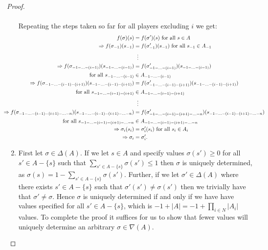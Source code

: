 \begin{proposition}
\begin{proof}
\begin{enumerate}
\begin{align*}
				\end{align*}
				Repeating the steps taken so far for all players excluding $i$ we get:
				\begin{align*}
					f(\sigma)(s) &= f(\sigma')(s) \text{ for all } s \in A\\
					\Rightarrow f(\sigma_{-1})(s_{-1}) &= f(\sigma'_{-1})(s_{-1}) \text{ for all } s_{-1} \in A_{-1} \\
					&\hspace{2mm} \vdots \\
					\Rightarrow f(\sigma_{-1-\ldots-(i-1)})(s_{-1-\ldots-(i-1)}) &= f(\sigma'_{-1-\ldots-(i-1)})(s_{-1-\ldots-(i-1)}) \\
					\text{ for all } s_{-1-\ldots-(i-1)} &\in A_{-1-\ldots-(i-1)} \\
					\Rightarrow f(\sigma_{-1-\ldots-(i-1)-(i+1)})(s_{-1-\ldots-(i-1)-(i+1)}) &= f(\sigma'_{-1-\ldots-(i-1)-(i+1)})(s_{-1-\ldots-(i-1)-(i+1)}) \\
					\text{ for all } s_{-1-\ldots-(i-1)-(i+1)} &\in A_{-1-\ldots-(i-1)-(i+1)} \\
					&\hspace{2mm} \vdots \\
					\hspace{-1cm}\Rightarrow f(\sigma_{-1-\ldots-(i-1)-(i+1)-\ldots-n})(s_{-1-\ldots-(i-1)-(i+1)-\ldots-n}) &= f(\sigma'_{-1-\ldots-(i-1)-(i+1)-\ldots-n})(s_{-1-\ldots-(i-1)-(i+1)-\ldots-n}) \\
					\text{ for all } s_{-1-\ldots-(i-1)-(i+1)-\ldots-n} &\in A_{-1-\ldots-(i-1)-(i+1)-\ldots-n} \\
					\Rightarrow \sigma_i(s_i) &= \sigma'_i(s_i) \text{ for all } s_i \in A_i \\
					\Rightarrow \sigma_i &= \sigma_i'.
				\end{align*}
				\item First let $\sigma \in \Delta(A)$. If we let $s \in A$ and specify values $\sigma(s') \geq 0$ for all $s' \in A-\{s\}$ such that $\sum_{s' \in A-\{s\}}\sigma(s') \leq 1$ then $\sigma$ is uniquely determined, as $\sigma(s) = 1 - \sum_{s' \in A-\{s\}}\sigma(s')$. Further, if we let $\sigma' \in \Delta(A)$ where there exists $s' \in A-\{s\}$ such that $\sigma'(s') \neq \sigma(s')$ then we trivially have that $\sigma' \neq \sigma$. Hence $\sigma$ is uniquely determined if and only if we have have values specified for all $s' \in A-\{s\}$, which is $-1 + |A| = -1 + \prod_{i \in N}|A_i|$ values. To complete the proof it suffices for us to show that fewer values will uniquely determine an arbitrary $\sigma \in \nabla(A)$.
				

\end{enumerate}
\end{proof}
\end{proposition}
